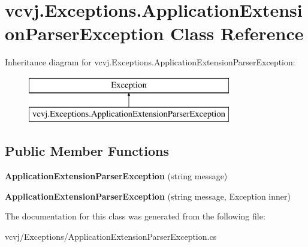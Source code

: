 \hypertarget{classvcvj_1_1_exceptions_1_1_application_extension_parser_exception}{}\section{vcvj.\+Exceptions.\+Application\+Extension\+Parser\+Exception Class Reference}
\label{classvcvj_1_1_exceptions_1_1_application_extension_parser_exception}
Inheritance diagram for vcvj.\+Exceptions.\+Application\+Extension\+Parser\+Exception\+:\begin{figure}[H]
\begin{center}
\leavevmode
\includegraphics[height=2.000000cm]{classvcvj_1_1_exceptions_1_1_application_extension_parser_exception}
\end{center}
\end{figure}
\subsection*{Public Member Functions}
\begin{DoxyCompactItemize}
\item 
{\bfseries Application\+Extension\+Parser\+Exception} (string message)\hypertarget{classvcvj_1_1_exceptions_1_1_application_extension_parser_exception_a310bacfb7ca4f0fa4b560ef703a0d50c}{}\label{classvcvj_1_1_exceptions_1_1_application_extension_parser_exception_a310bacfb7ca4f0fa4b560ef703a0d50c}

\item 
{\bfseries Application\+Extension\+Parser\+Exception} (string message, Exception inner)\hypertarget{classvcvj_1_1_exceptions_1_1_application_extension_parser_exception_af0053eceba294b2a57801615479998d7}{}\label{classvcvj_1_1_exceptions_1_1_application_extension_parser_exception_af0053eceba294b2a57801615479998d7}

\end{DoxyCompactItemize}


The documentation for this class was generated from the following file\+:\begin{DoxyCompactItemize}
\item 
vcvj/\+Exceptions/Application\+Extension\+Parser\+Exception.\+cs\end{DoxyCompactItemize}
